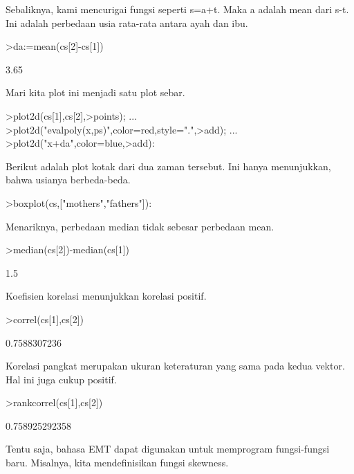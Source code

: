 \documentclass[a4paper,10pt]{article}
\begin{document}
\begin{eulernotebook}
\begin{eulercomment}
\begin{eulercomment}
\begin{eulercomment}
Sebaliknya, kami mencurigai fungsi seperti s=a+t. Maka a adalah mean
dari s-t. Ini adalah perbedaan usia rata-rata antara ayah dan ibu.
\end{eulercomment}
\begin{eulerprompt}
>da:=mean(cs[2]-cs[1])
\end{eulerprompt}
\begin{euleroutput}
  3.65
\end{euleroutput}
\begin{eulercomment}
Mari kita plot ini menjadi satu plot sebar.
\end{eulercomment}
\begin{eulerprompt}
>plot2d(cs[1],cs[2],>points);  ...
>plot2d("evalpoly(x,ps)",color=red,style=".",>add);  ...
>plot2d("x+da",color=blue,>add):
\end{eulerprompt}
\begin{eulercomment}
Berikut adalah plot kotak dari dua zaman tersebut. Ini hanya
menunjukkan, bahwa usianya berbeda-beda.
\end{eulercomment}
\begin{eulerprompt}
>boxplot(cs,["mothers","fathers"]):
\end{eulerprompt}
\begin{eulercomment}
Menariknya, perbedaan median tidak sebesar perbedaan mean.
\end{eulercomment}
\begin{eulerprompt}
>median(cs[2])-median(cs[1])
\end{eulerprompt}
\begin{euleroutput}
  1.5
\end{euleroutput}
\begin{eulercomment}
Koefisien korelasi menunjukkan korelasi positif.
\end{eulercomment}
\begin{eulerprompt}
>correl(cs[1],cs[2])
\end{eulerprompt}
\begin{euleroutput}
  0.7588307236
\end{euleroutput}
\begin{eulercomment}
Korelasi pangkat merupakan ukuran keteraturan yang sama pada kedua
vektor. Hal ini juga cukup positif.
\end{eulercomment}
\begin{eulerprompt}
>rankcorrel(cs[1],cs[2])
\end{eulerprompt}
\begin{euleroutput}
  0.758925292358
\end{euleroutput}
\begin{eulercomment}
Tentu saja, bahasa EMT dapat digunakan untuk memprogram fungsi-fungsi
baru. Misalnya, kita mendefinisikan fungsi skewness.


\end{eulercomment}
\end{eulercomment}
\end{eulercomment}
\end{eulernotebook}
\end{document}
